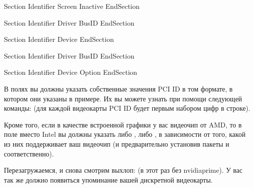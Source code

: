 \documentclass[letterpaper,10pt,russian,openany]{sphinxmanual}
\begin{document}
\begin{sphinxVerbatim}[commandchars=\\\{\}]
Section 
  Identifier 
  Screen  
  Inactive 
EndSection

Section 
    Identifier  
    Driver      
    BusID        
EndSection

Section 
    Identifier 
    Device 
EndSection

Section 
    Identifier  
    Driver      
    BusID         
EndSection

Section 
    Identifier 
    Device 
    Option 
EndSection
\end{sphinxVerbatim}

\sphinxAtStartPar
В полях  вы должны указать собственные значения PCI ID в том формате, в котором они указаны в примере.
Их вы можете узнать при помощи следующей команды:  (для каждой видеокарты PCI ID будет первым набором цифр в строке).

\sphinxAtStartPar
Кроме того, если в качестве встроенной графики у вас видеочип от AMD, то в поле  вместо Intel вы должны
указать либо , либо , в зависимости от того, какой из них поддерживает ваш видеочип (и предварительно
установив пакеты  и  соответственно).

\sphinxAtStartPar
Перезагружаемся, и снова смотрим выхлоп: 
(в этот раз без nvidia\sphinxhyphen{}prime). У вас так же должно появиться упоминание
вашей дискретной видеокарты.
\end{document}
